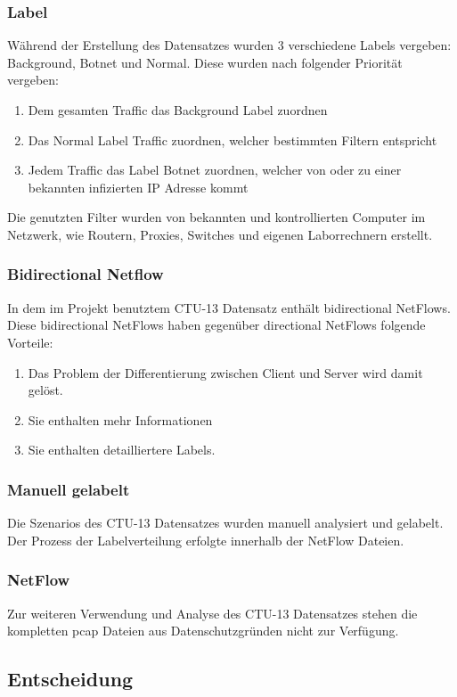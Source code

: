 \documentclass[main.tex]{subfiles}
\begin{document}
\subsubsection{Label}
Während der Erstellung des Datensatzes wurden 3 verschiedene Labels vergeben: Background, Botnet und Normal. Diese wurden nach folgender Priorität vergeben: 
\begin{center}
\begin{enumerate}
\item Dem gesamten Traffic das Background Label zuordnen
\item Das Normal Label Traffic zuordnen, welcher bestimmten Filtern entspricht
\item Jedem Traffic das Label Botnet zuordnen, welcher von oder zu einer bekannten infizierten IP Adresse kommt
\end{enumerate}
\end{center}
Die genutzten Filter wurden von bekannten und kontrollierten Computer im Netzwerk, wie Routern, Proxies, Switches und eigenen Laborrechnern erstellt.
\subsubsection{Bidirectional Netflow}
In dem im Projekt benutztem CTU-13 Datensatz enthält bidirectional NetFlows. Diese bidirectional NetFlows haben gegenüber directional NetFlows folgende Vorteile: 
\begin{center}
\begin{enumerate}
\item Das Problem der Differentierung zwischen Client und Server wird damit gelöst.
\item Sie enthalten mehr Informationen
\item Sie enthalten detailliertere Labels.
\end{enumerate}
\end{center}
\subsubsection{Manuell gelabelt}
Die Szenarios des CTU-13 Datensatzes wurden manuell analysiert und gelabelt. Der Prozess der Labelverteilung erfolgte innerhalb der NetFlow Dateien.
\subsubsection{NetFlow}
Zur weiteren Verwendung und Analyse des CTU-13 Datensatzes stehen die kompletten pcap Dateien aus Datenschutzgründen nicht zur Verfügung.
\subsection{Entscheidung}
\end{document}
